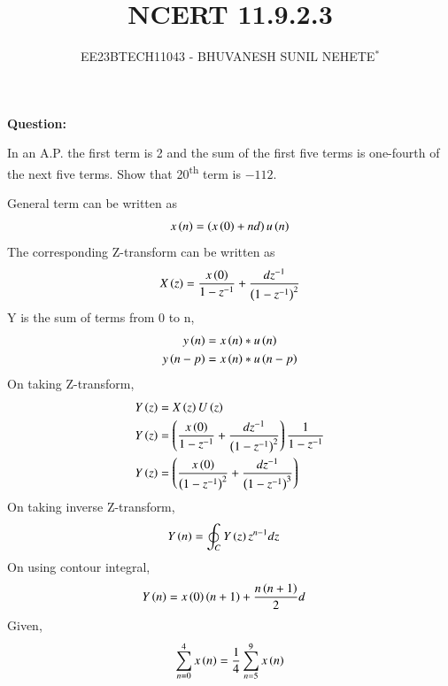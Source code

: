 \documentclass[journal,12pt,twocolumn]{IEEEtran}
\theoremstyle{remark}
\begin{document}

\vspace{3cm}

\title{NCERT 11.9.2.3}
\author{EE23BTECH11043 - BHUVANESH SUNIL NEHETE$^{*}$%
}
\maketitle
\newpage
\bigskip

\renewcommand{\thefigure}{\theenumi}
\renewcommand{\thetable}{\theenumi}



\textbf{Question:}

In an A.P. the first term is 2 and the sum of the first five terms is one-fourth of the next five terms. Show that 20\textsuperscript{th} term is $-112$.

\solution



General term can be written as
\begin{align}
    x\left(n\right) = \left(x\left(0\right) + nd\right)u\left(n\right)
\end{align}
The corresponding Z-transform can be written as 
\begin{align}
    X\left(z\right) = \frac{x\left(0\right)}{1 - z^{-1}} + \frac{dz^{-1}}{\left(1 - z^{-1}\right)^{2}} \label{eq2}
\end{align}
Y is the sum of terms from 0 to n,
    \begin{align}
        y\left(n\right) &= x\left(n\right) * u\left(n\right)\\
        y\left(n-p\right) &= x\left(n\right) * u\left(n-p\right)
    \end{align}
On taking Z-transform,
    \begin{align}
        Y\left(z\right) &= X\left(z\right)U\left(z\right)\\
        Y\left(z\right) &= \left(\frac{x\left(0\right)}{1 - z^{-1}} + \frac{dz^{-1}}{\left(1 - z^{-1}\right)^{2}}\right)\frac{1}{1-z^{-1}}\\
        Y\left(z\right) &= \left(\frac{x\left(0\right)}{\left(1 - z^{-1}\right)^2} + \frac{dz^{-1}}{\left(1 - z^{-1}\right)^{3}}\right)
    \end{align}
On taking inverse Z-transform, 
    \begin{align}
        Y\left(n\right) &= \oint_{C} Y\left(z\right)z^{n-1}dz
    \end{align}
On using contour integral,
    \begin{align}
        Y\left(n\right) &= x\left(0\right)\left(n+1\right) + \frac{n\left(n+1\right)}{2}d
    \end{align}
Given, 
   \begin{align}
       \sum_{n=0}^{4}x\left(n\right) = \frac{1}{4}\sum_{n=5}^{9}x\left(n\right)
   \end{align}
\end{document}
